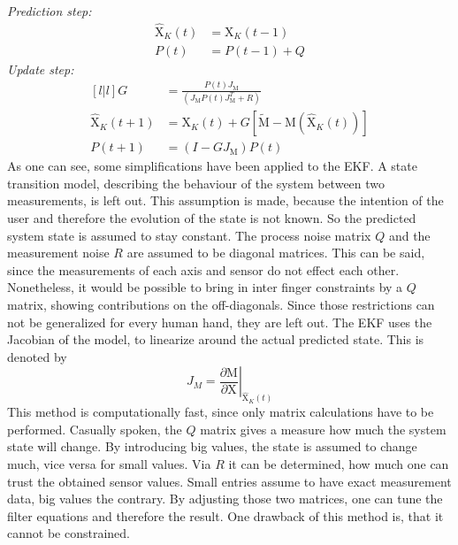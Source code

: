 \emph{Prediction step:}
\begin{equation}
\begin{aligned}
\hat{\mathrm{X}}_{K}(t) &= \mathrm{X}_{K}(t-1)\\
P(t) &= P(t-1) + Q
\end{aligned}
\end{equation}
\emph{Update step:}
\begin{equation}
\begin{aligned}[l|l]
G &= \frac{P(t) J_{\mathrm{M}}}{(J_{\mathrm{M}} P(t) J_{\mathrm{M}}^{T} + R)} \\
\hat{\mathrm{X}}_{K}(t+1) &= \mathrm{X}_{K}(t) + G[\tilde{\mathrm{M}} - \mathrm{M}(\hat{\mathrm{X}}_{K}(t))]\\
P(t+1) &= (I - G J_{\mathrm{M}}) P(t)
\end{aligned}
\end{equation}
As one can see, some simplifications have been applied to the \ac{EKF}. A state transition model, describing the behaviour of the system between two measurements, is left out. This assumption is made, because the intention of the user and therefore the evolution of the state is not known. So the predicted system state is assumed to stay constant. The process noise matrix $ Q $ and the measurement noise $ R $ are assumed to be diagonal matrices. This can be said, since the measurements of each axis and sensor do not effect each other. Nonetheless, it would be possible to bring in inter finger constraints by a $ Q $ matrix, showing contributions on the off-diagonals. Since those restrictions can not be generalized for every human hand, they are left out. The \ac{EKF} uses the Jacobian of the model, to linearize around the actual predicted state. This is denoted by
\begin{equation}
J_{M} = \left . \frac{\partial \mathrm{M}}{\partial \mathrm{X}} \right \vert _{\hat{\mathrm{X}}_{K}(t)}
\end{equation}
This method is computationally fast, since only matrix calculations have to be performed. Casually spoken, the $ Q $ matrix gives a measure how much the system state will change. By introducing big values, the state is assumed to change much, vice versa for small values. Via $ R $ it can be determined, how much one can trust the obtained sensor values. Small entries assume to have exact measurement data, big values the contrary. By adjusting those two matrices, one can tune the filter equations and therefore the result. One drawback of this method is, that it cannot be constrained.





